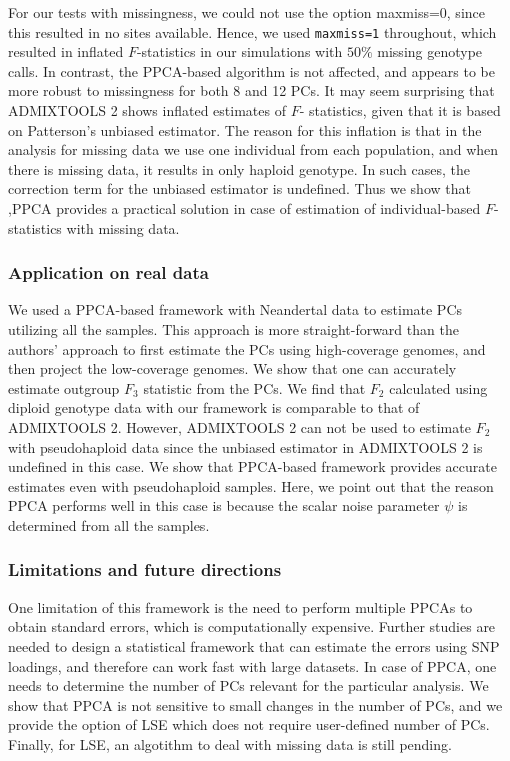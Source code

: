 \documentclass[12pt]{article}
\begin{document}
For our tests with missingness, we could not use the option maxmiss=0, since this resulted in no sites available. Hence, we used \texttt{maxmiss=1} throughout, which resulted in inflated $F$-statistics in our simulations with $50\%$ missing genotype calls. In contrast, the PPCA-based algorithm is not affected, and appears to be more robust to missingness for both 8 and 12 PCs. It may seem surprising that ADMIXTOOLS 2 shows inflated estimates of $F$- statistics, given that it is based on Patterson's unbiased estimator. The reason for this inflation is that in the analysis for missing data we use one individual from each population, and when there is missing data, it results in only haploid genotype. In such cases, the correction term for the unbiased estimator is undefined. Thus we show that ,PPCA provides a practical solution in case of estimation of individual-based $F$-statistics with missing data. 

\subsubsection{Application on real data}
We used a PPCA-based framework with Neandertal data to estimate PCs utilizing all the samples. This approach is more straight-forward than the authors' approach to first estimate the PCs using high-coverage genomes, and then project the low-coverage genomes. We show that one can accurately estimate outgroup $F_3$ statistic from the PCs. We find that $F_2$ calculated using diploid genotype data with our framework is comparable to that of ADMIXTOOLS 2. However, ADMIXTOOLS 2 can not be used to estimate $F_2$ with pseudohaploid data since the unbiased estimator in ADMIXTOOLS 2 is undefined in this case. We show that PPCA-based framework provides accurate estimates even with pseudohaploid samples. Here, we point out that the reason PPCA performs well in this case is because the scalar noise parameter $\psi$ is determined from all the samples.

\subsubsection{Limitations and future directions}
One limitation of this framework is the need to perform multiple PPCAs to obtain standard errors, which is computationally expensive. Further studies are needed to design a statistical framework that can estimate the errors using SNP loadings, and therefore can work fast with large datasets. In case of PPCA, one needs to determine the number of PCs relevant for the particular analysis. We show that PPCA is not sensitive to small changes in the number of PCs, and we provide the option of LSE which does not require user-defined number of PCs. Finally, for LSE, an algotithm to deal with missing data is still pending. 
\end{document}
